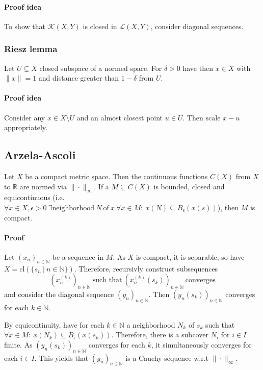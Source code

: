 \documentclass{scrartcl}
\newcommand{\R}{\mathbb{R}}
\newcommand{\N}{\mathbb{N}}
\begin{document}
\paragraph{Proof idea} To show that $\mathcal{K}(X, Y)$ is closed in $\mathcal{L}(X, Y)$, consider diagonal sequences.

\subsubsection{Riesz lemma}
\label{riesz_lemma}
Let $U \subsetneq X$ closed subspace of a normed space. For $\delta > 0$ have then $x \in X$ with $\|x\|=1$ and distance greater than $1 - \delta$ from $U$.
\paragraph{Proof idea} Consider any $x \in X \setminus U$ and an almost closest point $u \in U$. Then scale $x - u$ appropriately.

\subsection{Arzela-Ascoli}
\label{arzela_ascoli}
Let $X$ be a compact metric space. Then the continuous functions $C(X)$ from $X$ to $\R$ are normed via $\|\cdot\|_{\infty}$.
If a $M \subseteq C(X)$ is bounded, closed and equicontinuous (i.e. $\forall x \in X, \epsilon > 0 \ \exists \mathrm{neighborhood} \ N \ \mathrm{of} \ x \ \forall x \in M: \ x(N) \subseteq B_{\epsilon}(x(s))$), then $M$ is compact.

\paragraph{Proof} Let $(x_n)_{n \in \N}$ be a sequence in $M$. As $X$ is compact, it is separable, so have $X = \mathrm{cl}(\{ s_n \ | \ n \in \N \})$.
Therefore, recursivly construct subsequences
\begin{equation*}
    \left(x_n^{(k)}\right)_{n \in \N} \ \text{such that} \ \left(x_n^{(k)}(s_k)\right)_{n \in \N} \ \text{converges}
\end{equation*}
and consider the diagonal sequence $(y_n)_{n \in \N}$. Then $(y_n(s_k))_{n \in \N}$ converges for each $k \in \N$.

By equicontinuity, have for each $k \in \N$ a neighborhood $N_k$ of $s_k$ such that $\forall x \in M: \ x(N_k) \subseteq B_\epsilon(x(s_k))$.
Therefore, there is a subcover $N_i$ for $i \in I$ finite. As $(y_n(s_k))_{n \in \N}$ converges for each $k$, it simultaneously converges for each $i \in I$. This yields that $(y_n)_{n \in \N}$ is a Cauchy-sequence w.r.t $\|\cdot\|_{\infty}$.
\end{document}
